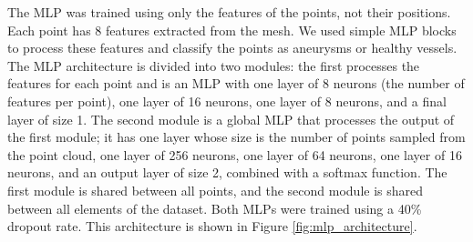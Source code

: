 \documentclass[%
 reprint,
 amsmath,amssymb,
 aps,
 floatfix,
 nofootinbib,
]{revtex4-2}
\begin{document}
The MLP was trained using only the features of the points, not their positions. Each point has 8 features extracted from the mesh. We used simple MLP blocks to process these features and classify the points as aneurysms or healthy vessels. The MLP architecture is divided into two modules: the first processes the features for each point and is an MLP with one layer of 8 neurons (the number of features per point), one layer of 16 neurons, one layer of 8 neurons, and a final layer of size 1. The second module is a global MLP that processes the output of the first module; it has one layer whose size is the number of points sampled from the point cloud, one layer of 256 neurons, one layer of 64 neurons, one layer of 16 neurons, and an output layer of size 2, combined with a softmax function. The first module is shared between all points, and the second module is shared between all elements of the dataset. Both MLPs were trained using a 40\% dropout rate.  This architecture is shown in Figure \ref{fig:mlp_architecture}.
\end{document}
